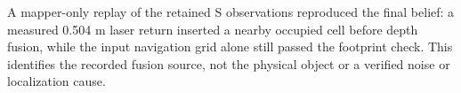 A mapper-only replay of the retained S observations reproduced the final belief: a measured 0.504 m laser return inserted a nearby occupied cell before depth fusion, while the input navigation grid alone still passed the footprint check. This identifies the recorded fusion source, not the physical object or a verified noise or localization cause.




